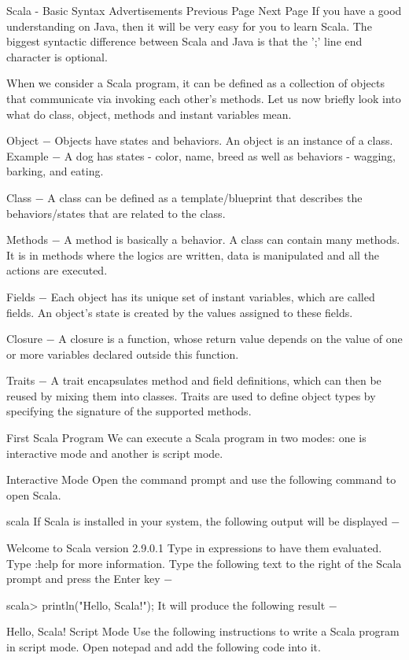 Scala - Basic Syntax
Advertisements
 Previous Page Next Page  
If you have a good understanding on Java, then it will be very easy for you to learn Scala. The biggest syntactic difference between Scala and Java is that the ';' line end character is optional.

When we consider a Scala program, it can be defined as a collection of objects that communicate via invoking each other’s methods. Let us now briefly look into what do class, object, methods and instant variables mean.

Object − Objects have states and behaviors. An object is an instance of a class. Example − A dog has states - color, name, breed as well as behaviors - wagging, barking, and eating.

Class − A class can be defined as a template/blueprint that describes the behaviors/states that are related to the class.

Methods − A method is basically a behavior. A class can contain many methods. It is in methods where the logics are written, data is manipulated and all the actions are executed.

Fields − Each object has its unique set of instant variables, which are called fields. An object's state is created by the values assigned to these fields.

Closure − A closure is a function, whose return value depends on the value of one or more variables declared outside this function.

Traits − A trait encapsulates method and field definitions, which can then be reused by mixing them into classes. Traits are used to define object types by specifying the signature of the supported methods.

First Scala Program
We can execute a Scala program in two modes: one is interactive mode and another is script mode.

Interactive Mode
Open the command prompt and use the following command to open Scala.

\>scala
If Scala is installed in your system, the following output will be displayed −

Welcome to Scala version 2.9.0.1
Type in expressions to have them evaluated.
Type :help for more information.
Type the following text to the right of the Scala prompt and press the Enter key −

scala> println("Hello, Scala!");
It will produce the following result −

Hello, Scala!
Script Mode
Use the following instructions to write a Scala program in script mode. Open notepad and add the following code into it.

